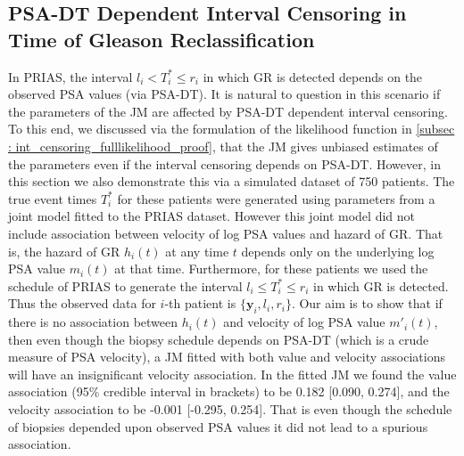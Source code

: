 \clearpage
\subsection{PSA-DT Dependent Interval Censoring in Time of Gleason Reclassification}
In PRIAS, the interval $l_i < T_i^* \leq r_i$ in which GR is detected depends on the observed PSA values (via PSA-DT). It is natural to question in this scenario if the parameters of the JM are affected by PSA-DT dependent interval censoring. To this end, we discussed via the formulation of the likelihood function in \ref{subsec : int_censoring_fulllikelihood_proof}, that the JM gives unbiased estimates of the parameters even if the interval censoring depends on PSA-DT. However, in this section we also demonstrate this via a simulated dataset of 750 patients. The true event times $T^*_i$ for these patients were generated using parameters from a joint model fitted to the PRIAS dataset. However this joint model did not include association between velocity of log PSA values and hazard of GR. That is, the hazard of GR $h_i(t)$ at any time $t$ depends only on the underlying log PSA value $m_i(t)$ at that time. Furthermore, for these patients we used the schedule of PRIAS to generate the interval $l_i \leq T^*_i \leq r_i$ in which GR is detected. Thus the observed data for $i$-th patient is $\{\boldsymbol{y}_i, l_i, r_i\}$. Our aim is to show that if there is no association between $h_i(t)$ and velocity of log PSA value $m'_i(t)$, then even though the biopsy schedule depends on PSA-DT (which is a crude measure of PSA velocity), a JM fitted with both value and velocity associations will have an insignificant velocity association. In the fitted JM we found the value association (95\% credible interval in brackets) to be 0.182 [0.090, 0.274], and the velocity association to be -0.001 [-0.295, 0.254]. That is even though the schedule of biopsies depended upon observed PSA values it did not lead to a spurious association. 